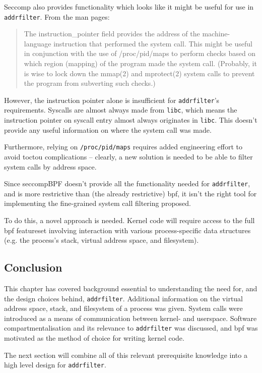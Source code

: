 Seccomp also provides functionality which looks like it might be useful for use in
\texttt{addrfilter}. From the man pages:

\begin{quote}
    The instruction\_pointer field provides the address of the machine-
    language instruction that performed the system call.  This might
    be useful in conjunction with the use of /proc/pid/maps to perform
    checks based on which region (mapping) of the program made the
    system call.  (Probably, it is wise to lock down the mmap(2) and
    mprotect(2) system calls to prevent the program from subverting
    such checks.)
\end{quote}

However, the instruction pointer alone is insufficient for \texttt{addrfilter}'s
requirements. 
Syscalls are almost always made from \texttt{libc}, which means the instruction
pointer on syscall entry almost always originates in \texttt{libc}. This doesn't
provide any useful information on where the system call was made. 

Furthermore, relying on \texttt{/proc/pid/maps} requires added engineering
effort to avoid \ac{toctou} complications -- clearly, a new solution is needed
to be able to filter system calls by address space. 

Since seccompBPF doesn't provide all the functionality needed for 
\texttt{addrfilter}, and is more restrictive than (the already restrictive) 
\ac{bpf}, it isn't the right tool for implementing the fine-grained system
call filtering proposed.

To do this, a novel approach is needed. Kernel code will require access to the full
\ac{bpf} featureset involving interaction with various process-specific data
structures (e.g. the process's stack, virtual address space, and filesystem).

\subsection{Conclusion}

This chapter has covered background essential to understanding the need for, and
the design choices behind, \texttt{addrfilter}. Additional information on the
virtual address space, stack, and filesystem of a process was given. System
calls were introduced as a means of communication between kernel- and userspace.
Software compartmentalisation and its relevance to \texttt{addrfilter} was
discussed, and \ac{bpf} was motivated as the method of choice for writing kernel
code. 

The next section will combine all of this relevant prerequisite knowledge into a
high level design for \texttt{addrfilter}.
